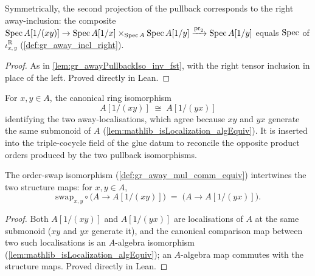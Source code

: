\begin{lemma}\leanok
  \label{lem:gr_awayPullbackIso_inv_snd}
  Symmetrically, the second projection of the pullback corresponds to the right
  away-inclusion: the composite
  \(\operatorname{Spec} A[1/(xy)] \to \operatorname{Spec} A[1/x] \times_{\operatorname{Spec} A} \operatorname{Spec} A[1/y]
    \xrightarrow{\mathrm{pr}_2} \operatorname{Spec} A[1/y]\)
  equals \(\operatorname{Spec}\) of \(\iota^{\mathrm{R}}_{x,y}\)
  (\cref{def:gr_away_incl_right}).
\end{lemma}
\begin{proof}
  \leanok
  As in \cref{lem:gr_awayPullbackIso_inv_fst}, with the right tensor inclusion in
  place of the left. Proved directly in Lean.
\end{proof}

\begin{definition}\leanok
  \label{def:gr_away_mul_comm_equiv}
  For \(x, y \in A\), the canonical ring isomorphism
  \[
    A[1/(xy)] \;\cong\; A[1/(yx)]
  \]
  identifying the two away-localisations, which agree because \(xy\) and \(yx\)
  generate the same submonoid of \(A\)
  (\cref{lem:mathlib_isLocalization_algEquiv}). It is inserted into the
  triple-cocycle field of the glue datum to reconcile the opposite product
  orders produced by the two pullback isomorphisms.
\end{definition}

\begin{lemma}\leanok
  \label{lem:gr_awayMulCommEquiv_comp_algebraMap}
  The order-swap isomorphism (\cref{def:gr_away_mul_comm_equiv}) intertwines the
  two structure maps: for \(x, y \in A\),
  \[
    \mathrm{swap}_{x,y} \circ \bigl(A \to A[1/(xy)]\bigr)
      \;=\; \bigl(A \to A[1/(yx)]\bigr).
  \]
\end{lemma}
\begin{proof}
  \leanok
  Both \(A[1/(xy)]\) and \(A[1/(yx)]\) are localisations of \(A\) at the same
  submonoid (\(xy\) and \(yx\) generate it), and the canonical comparison map
  between two such localisations is an \(A\)-algebra isomorphism
  (\cref{lem:mathlib_isLocalization_algEquiv}); an \(A\)-algebra map commutes with
  the structure maps. Proved directly in Lean.
\end{proof}


